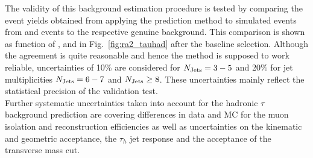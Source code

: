The validity of this background estimation procedure is tested by comparing the event yields obtained from applying the prediction method to simulated events from \ttbar and \WJets events to the respective genuine background. This comparison is shown as function of \HT, \MHT and \NJets in Fig.~\ref{fig:ra2_tauhad} after the baseline selection. Although the agreement is quite reasonable and hence the method is supposed to work reliable, uncertainties of 10\% are considered for $N_{\text{Jets}} = 3 - 5$ and 20\% for jet multiplicities $N_{\text{Jets}} = 6 - 7$ and $N_{\text{Jets}} \ge 8$. These uncertainties mainly reflect the statistical precision of the validation test. \\
Further systematic uncertainties taken into account for the hadronic $\tau$ background prediction are covering differences in data and MC for the muon isolation and reconstruction efficiencies as well as uncertainties on the kinematic and geometric acceptance, the $\tau_h$ jet response and the acceptance of the transverse mass cut. 


